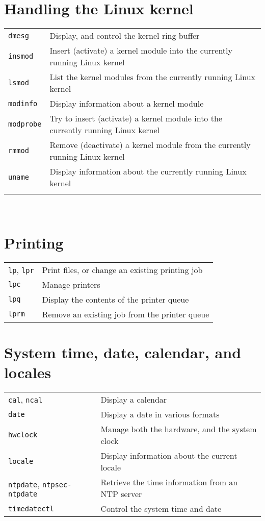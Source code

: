 \documentclass[10pt]{article}
\begin{document}
\begin{multicols}{2}
\section{Handling the Linux kernel}
\begin{tabular}{ p{2.5cm} p{8.5cm} }
  \hline
  \texttt{dmesg} & Display, and control the kernel ring buffer\\
  \rowcolor{Gray}
  \texttt{insmod} & Insert (activate) a kernel module into the currently running Linux kernel\\
  \texttt{lsmod} & List the kernel modules from the currently running Linux kernel \\
  \rowcolor{Gray}
  \texttt{modinfo} & Display information about a kernel module \\
  \texttt{modprobe} & Try to insert (activate) a kernel module into the currently running Linux kernel \\
  \rowcolor{Gray}
  \texttt{rmmod} & Remove (deactivate) a kernel module from the currently running Linux kernel \\
  \texttt{uname} & Display information about the currently running Linux kernel\\
  \hline
  & \\
\end{tabular}

~\hfill

\section{Printing}
\begin{tabular}{ p{2.5cm} p{8.5cm} }
  \hline
  \texttt{lp}, \texttt{lpr} & Print files, or change an existing printing job\\
  \rowcolor{Gray}
  \texttt{lpc} & Manage printers \\
  \texttt{lpq} & Display the contents of the printer queue\\
  \rowcolor{Gray}
  \texttt{lprm} & Remove an existing job from the printer queue \\
  \hline
\end{tabular}

\section{System time, date, calendar, and locales}
\begin{tabular}{ p{2.5cm} p{8.5cm} }
  \hline
  \texttt{cal}, \texttt{ncal} & Display a calendar\\
  \rowcolor{Gray}
  \texttt{date} & Display a date in various formats\\
  \texttt{hwclock} & Manage both the hardware, and the system clock\\
  \rowcolor{Gray}
  \texttt{locale} & Display information about the current locale \\
  \texttt{ntpdate}, \texttt{ntpsec-ntpdate} & Retrieve the time information from an NTP server \\
  \rowcolor{Gray}
  \texttt{timedatectl} & Control the system time and date \\
  \hline
\end{tabular}
\end{multicols}
\end{document}
